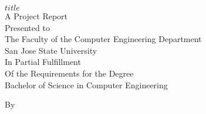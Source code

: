 \begin{center}
$title$\\
\vspace*{\fill}
A Project Report\\
Presented to\\
The Faculty of the Computer Engineering Department\\
San Jose State University\\
In Partial Fulfillment\\
Of the Requirements for the Degree\\
Bachelor of Science in Computer Engineering\\
\vspace*{\fill}

By\\
\author{$for(author)$
	$author$ $sep$ \and 
$endfor$}
\date{$date$}
\end{center}